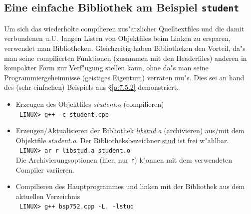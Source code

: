 \subsection{Eine einfache Bibliothek am Beispiel \texttt{student}}
\label{p:7.5.3}
%
Um sich das wiederholte compilieren zus"atzlicher Quelltextfiles
und die damit verbundenen u.U.\  langen Listen von Objektfiles
beim Linken zu ersparen, verwendet man Bibliotheken.
Gleichzeitig haben Bibliotheken den Vorteil, da"s man seine
compilierten Funktionen (zusammen mit den Headerfiles) anderen in kompakter
Form zur Verf"ugung stellen kann, ohne da"s
man seine Programmiergeheimnisse (geistiges Eigentum) verraten mu"s.
Dies sei an hand des (sehr einfachen) Beispiels aus \S\ref{p:7.5.2}
demonstriert.
\begin{itemize}
 \item Erzeugen des Objektfiles \textit{student.o} (compilieren)
    \\[0.2ex]
    \verb| LINUX> g++ -c student.cpp |
 \item Erzeugen/Aktualisieren der Bibliothek \textit{lib\underline{stud}.a}
 	(archivieren) aus/mit dem Objektfile  \textit{student.o}.
	Der Bibliotheksbezeichner \underline{stud} ist frei w"ahlbar.
    \\[0.2ex]
    \verb| LINUX> ar r libstud.a student.o|
    \\[0.2ex]
    Die Archivierungsoptionen (hier, nur \verb|r|) k"onnen mit
    dem verwendeten Compiler variieren.
 \item Compilieren des Hauptprogrammes  und
       linken mit der Bibliothek aus dem aktuellen Verzeichnis
    \\[0.2ex]
    \verb| LINUX> g++ bsp752.cpp -L. -lstud|
\end{itemize}
%

